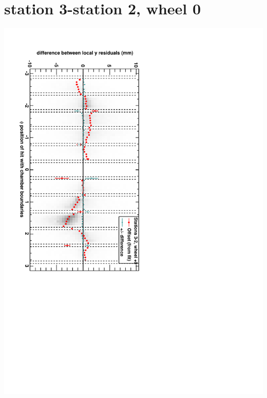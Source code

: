 \documentclass[compress]{beamer}
\begin{document}
\section*{station 3-station 2, wheel 0}
\begin{frame} \vfill \mbox{\hspace{-1 cm}\includegraphics[height=1.2\linewidth, angle=90]{DTzdiff23VsPhi_whC_slope.pdf}} \end{frame}
\end{document}
